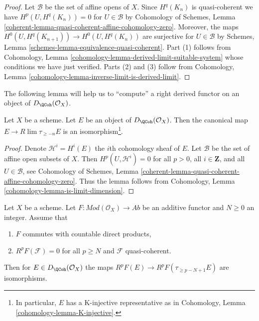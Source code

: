 \begin{proof}
Let $\mathcal{B}$ be the set of affine opens of $X$.
Since $H^q(K_n)$ is quasi-coherent we have $H^p(U, H^q(K_n)) = 0$
for $U \in \mathcal{B}$ by Cohomology of Schemes, Lemma
\ref{coherent-lemma-quasi-coherent-affine-cohomology-zero}.
Moreover, the maps $H^0(U, H^q(K_{n + 1})) \to H^0(U, H^q(K_n))$
are surjective for $U \in \mathcal{B}$ by
Schemes, Lemma \ref{schemes-lemma-equivalence-quasi-coherent}.
Part (1) follows from Cohomology, Lemma
\ref{cohomology-lemma-derived-limit-suitable-system}
whose conditions we have just verified.
Parts (2) and (3) follow from
Cohomology, Lemma \ref{cohomology-lemma-inverse-limit-is-derived-limit}.
\end{proof}

\noindent
The following lemma will help us to ``compute'' a right derived functor
on an object of $D_\QCoh(\mathcal{O}_X)$.

\begin{lemma}
\label{lemma-nice-K-injective}
Let $X$ be a scheme. Let $E$ be an object of
$D_\QCoh(\mathcal{O}_X)$. Then the canonical map
$E \to R\lim \tau_{\geq -n}E$ is an isomorphism\footnote{In particular,
$E$ has a K-injective representative as in
Cohomology, Lemma \ref{cohomology-lemma-K-injective}.}.
\end{lemma}

\begin{proof}
Denote $\mathcal{H}^i = H^i(E)$ the $i$th cohomology sheaf of $E$.
Let $\mathcal{B}$ be the set of affine open subsets of $X$. Then
$H^p(U, \mathcal{H}^i) = 0$ for all $p > 0$, all $i \in \mathbf{Z}$,
and all $U \in \mathcal{B}$, see
Cohomology of Schemes, Lemma
\ref{coherent-lemma-quasi-coherent-affine-cohomology-zero}.
Thus the lemma follows from
Cohomology, Lemma \ref{cohomology-lemma-is-limit-dimension}.
\end{proof}

\begin{lemma}
\label{lemma-application-nice-K-injective}
Let $X$ be a scheme. Let $F : \textit{Mod}(\mathcal{O}_X) \to \textit{Ab}$
be an additive functor and $N \geq 0$ an integer. Assume that
\begin{enumerate}
\item $F$ commutes with countable direct products,
\item $R^pF(\mathcal{F}) = 0$ for all $p \geq N$ and $\mathcal{F}$
quasi-coherent.
\end{enumerate}
Then for $E \in D_\QCoh(\mathcal{O}_X)$ the maps
$R^pF(E) \to R^pF(\tau_{\geq p - N + 1}E)$ are isomorphisms.
\end{lemma}

